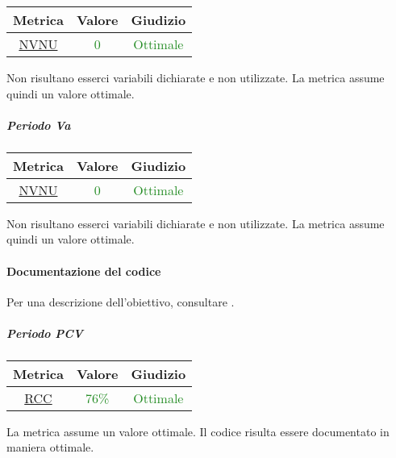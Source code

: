 			\begin{table}[H]
				\centering
				\begin{tabular}{  c | c | c}
					\hline
					\textbf{Metrica} & \textbf{Valore} & \textbf{Giudizio} \\
					\hline
					\hyperref[MMC]{NVNU}   & \textcolor{ForestGreen}{0}          & \textcolor{ForestGreen}{Ottimale}  \\ \hline
				\end{tabular} 
			\end{table}
		
			Non risultano esserci variabili dichiarate e non utilizzate. La metrica assume quindi un valore ottimale.
		
		
			\subparagraph{Periodo Va}
			
			\begin{table}[H]
				\centering
				\begin{tabular}{  c | c | c}
					\hline
					\textbf{Metrica} & \textbf{Valore} & \textbf{Giudizio} \\
					\hline
					\hyperref[MMC]{NVNU}   & \textcolor{ForestGreen}{0}          & \textcolor{ForestGreen}{Ottimale}  \\ \hline
				\end{tabular} 
			\end{table}
			
			Non risultano esserci variabili dichiarate e non utilizzate. La metrica assume quindi un valore ottimale.
			
			\newpage
			\paragraph{Documentazione del codice}
			Per una descrizione dell'obiettivo, consultare .
				\subparagraph{Periodo PCV}
				
				\begin{table}[H]
					\centering
					\begin{tabular}{  c | c | c}
						\hline
						\textbf{Metrica} & \textbf{Valore} & \textbf{Giudizio} \\
						\hline
						\hyperref[MMC]{RCC}   & \textcolor{ForestGreen}{76\%}          & \textcolor{ForestGreen}{Ottimale}  \\ \hline
					\end{tabular} 
				\end{table}	
			La metrica assume un valore ottimale. Il codice risulta essere documentato in maniera ottimale.
			
